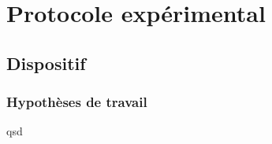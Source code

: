 \chapter{Protocole expérimental}
	\section{Dispositif}
	\subsection{Hypothèses de travail}
	\par qsd